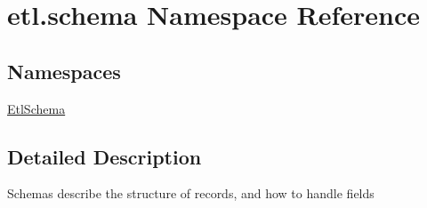 \hypertarget{namespaceetl_1_1schema}{\section{etl.\-schema Namespace Reference}
\label{namespaceetl_1_1schema}
}
\subsection*{Namespaces}
\begin{DoxyCompactItemize}
\item 
\hyperlink{namespaceetl_1_1schema_1_1EtlSchema}{Etl\-Schema}
\end{DoxyCompactItemize}


\subsection{Detailed Description}
\begin{DoxyVerb}Schemas describe the structure of records, and how to handle fields\end{DoxyVerb}
 